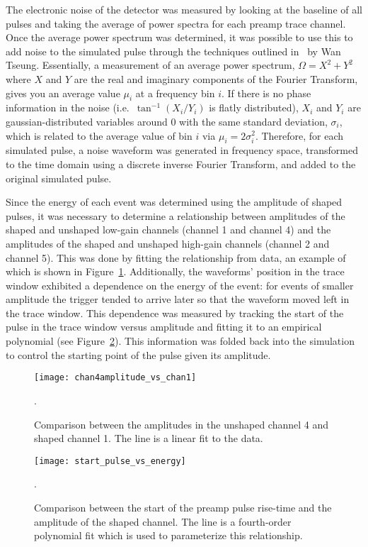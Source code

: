 	The electronic noise of the detector was measured by looking at the baseline of all pulses and taking the average of power spectra for each preamp trace channel.  Once the average power spectrum was determined, it was possible to use this to add noise to the simulated pulse through the techniques outlined in~\cite{WanThesis08} by Wan Tseung.  Essentially, a measurement of an average power spectrum, $\Omega = X^{2} + Y^{2}$ where $X$ and $Y$ are the real and imaginary components of the Fourier Transform, gives you an average value $\mu_{i}$ at a frequency bin $i$.  If there is no phase information in the noise (i.e.~$\tan^{-1} (X_{i}/Y_{i})$ is flatly distributed), $X_{i}$ and $Y_{i}$ are gaussian-distributed variables around 0 with the same standard deviation, $\sigma_{i}$, which is related to the average value of bin $i$ via  $\mu_{i} = 2 \sigma_{i}^{2}$.  Therefore, for each simulated pulse, a noise waveform was generated in frequency space, transformed to the time domain using a discrete inverse Fourier Transform, and added to the original simulated pulse.  
	
	Since the energy of each event was determined using the amplitude of shaped pulses, it was necessary to determine a relationship between amplitudes of the shaped and unshaped low-gain channels (channel 1 and channel 4) and the amplitudes of the shaped and unshaped high-gain channels (channel 2 and channel 5).  This was done by fitting the relationship from data, an example of which is shown in Figure~\ref{fig:Risetimechan2vschan4}.  Additionally, the waveforms' position in the trace window exhibited a dependence on the energy of the event: for events of smaller amplitude the trigger tended to arrive later so that the waveform moved left in the trace window.  This dependence was measured by tracking the start of the pulse in the trace window versus amplitude and fitting it to an empirical polynomial (see Figure~\ref{fig:TriggerPositionDependence}).  This information was folded back into the simulation to control the starting point of the pulse given its amplitude.
	
					\begin{figure}
						\centering
						\texttt{[image: chan4amplitude\_vs\_chan1]}
						\caption{Comparison between the amplitudes in the unshaped channel 4 and shaped channel 1.  
						The line is a linear fit to the data.}
						\label{fig:Risetimechan2vschan4}.
					\end{figure}
					
					\begin{figure}
						\centering
						\texttt{[image: start\_pulse\_vs\_energy]}
						\caption{Comparison between the start of the preamp pulse rise-time and the amplitude of the shaped channel.  
						The line is a fourth-order polynomial fit which is used to parameterize this relationship.}
						\label{fig:TriggerPositionDependence}.
					\end{figure}					
	
